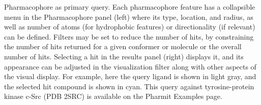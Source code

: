 \label{pharmfig} 
Pharmacophore as primary query. Each pharmacophore feature has a collapsible menu in the Pharmacophore panel (left) where its type, location, and radius, as well as number of atoms (for hydrophobic features) or directionality (if relevant) can be defined. Filters may be set to reduce the number of hits, by constraining the number of hits returned for a given conformer or molecule or the overall number of hits. Selecting a hit in the results panel (right) displays it, and its appearance can be adjusted in the visualization filter along with other aspects of the visual display.  For example, here the query ligand is shown in light gray, and the selected hit compound is shown in cyan. This query against tyrosine-protein kinase c-Src (PDB 2SRC) is available on the Pharmit Examples page.
